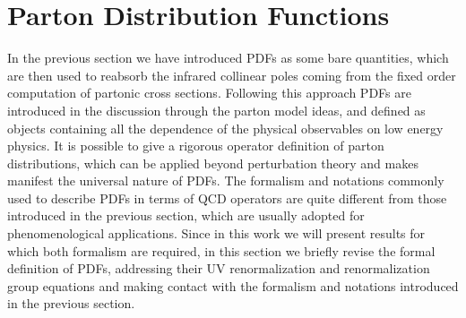 \section{Parton Distribution Functions}
In the previous section we have introduced PDFs as some bare quantities,
which are then used to reabsorb the infrared collinear poles coming from the fixed order computation of partonic
cross sections. Following this approach PDFs are introduced in the discussion through 
the parton model ideas, and defined as objects containing all the dependence 
of the physical observables on low energy physics. 
%
It is possible to give a rigorous operator definition of parton distributions,
which can be applied beyond perturbation theory and makes manifest the universal nature of PDFs.
The formalism and notations commonly used to describe PDFs in terms of QCD operators are quite different
from those introduced in the previous section, which are usually adopted for phenomenological applications.
Since in this work we will present results for which both formalism are required,
in this section we briefly revise the formal definition of PDFs, addressing their UV renormalization
and renormalization group equations and making contact with the formalism and notations introduced in the previous section.


